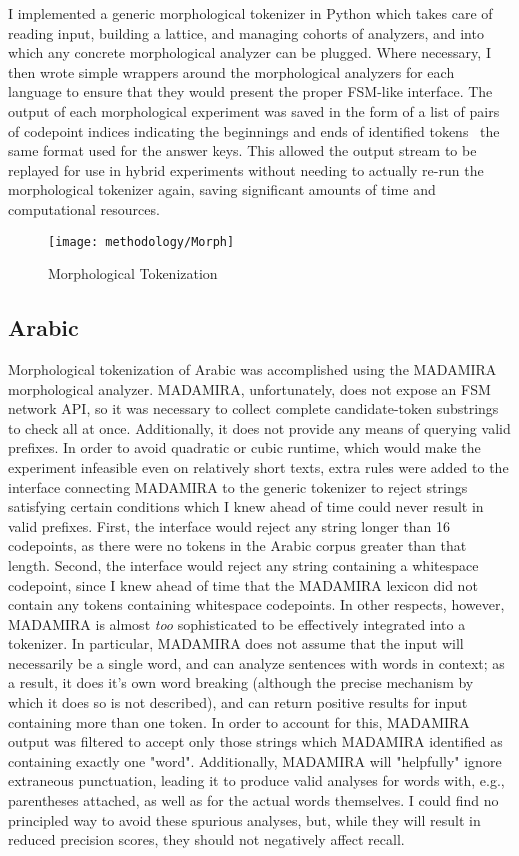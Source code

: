 I implemented a generic morphological tokenizer in Python which takes care of reading input, building a lattice, and managing cohorts of analyzers, and into which any concrete morphological analyzer can be plugged. Where necessary, I then wrote simple wrappers around the morphological analyzers for each language to ensure that they would present the proper FSM-like interface.
The output of each morphological experiment was saved in the form of a list of pairs of codepoint indices indicating the beginnings and ends of identified tokens\textemdash~ the same format used for the answer keys. This allowed the output stream to be replayed for use in hybrid experiments without needing to actually re-run the morphological tokenizer again, saving significant amounts of time and computational resources.

\begin{figure}[ht!]
	\texttt{[image: methodology/Morph]}
	\caption{Morphological Tokenization}
	\label{morphdiagram}
\end{figure}

\subsection{Arabic}
Morphological tokenization of Arabic was accomplished using the MADAMIRA morphological analyzer\cite{pasha14}. MADAMIRA, unfortunately, does not expose an FSM network API, so it was necessary to collect complete candidate-token substrings to check all at once. Additionally, it does not provide any means of querying valid prefixes. In order to avoid quadratic or cubic runtime, which would make the experiment infeasible even on relatively short texts, extra rules were added to the interface connecting MADAMIRA to the generic tokenizer to reject strings satisfying certain conditions which I knew ahead of time could never result in valid prefixes. First, the interface would reject any string longer than 16 codepoints, as there were no tokens in the Arabic corpus greater than that length. Second, the interface would reject any string containing a whitespace codepoint, since I knew ahead of time that the MADAMIRA lexicon did not contain any tokens containing whitespace codepoints.
In other respects, however, MADAMIRA is almost \textit{too} sophisticated to be effectively integrated into a tokenizer. In particular, MADAMIRA does not assume that the input will necessarily be a single word, and can analyze sentences with words in context; as a result, it does it's own word breaking (although the precise mechanism by which it does so is not described), and can return positive results for input containing more than one token. In order to account for this, MADAMIRA output was filtered to accept only those strings which MADAMIRA identified as containing exactly one "word". Additionally, MADAMIRA will "helpfully" ignore extraneous punctuation, leading it to produce valid analyses for words with, e.g., parentheses attached, as well as for the actual words themselves. I could find no principled way to avoid these spurious analyses, but, while they will result in reduced precision scores, they should not negatively affect recall.

